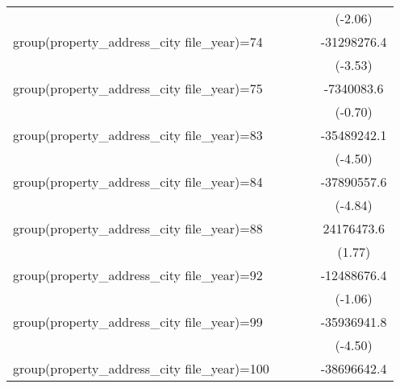 {\begin{tabular}{l*{4}{c}}
                    &                     &                     &                     &     (-2.06)         \\
\addlinespace
group(property\_address\_city file\_year)=74&                     &                     &                     & -31298276.4\sym{***}\\
                    &                     &                     &                     &     (-3.53)         \\
\addlinespace
group(property\_address\_city file\_year)=75&                     &                     &                     &  -7340083.6         \\
                    &                     &                     &                     &     (-0.70)         \\
\addlinespace
group(property\_address\_city file\_year)=83&                     &                     &                     & -35489242.1\sym{***}\\
                    &                     &                     &                     &     (-4.50)         \\
\addlinespace
group(property\_address\_city file\_year)=84&                     &                     &                     & -37890557.6\sym{***}\\
                    &                     &                     &                     &     (-4.84)         \\
\addlinespace
group(property\_address\_city file\_year)=88&                     &                     &                     &  24176473.6         \\
                    &                     &                     &                     &      (1.77)         \\
\addlinespace
group(property\_address\_city file\_year)=92&                     &                     &                     & -12488676.4         \\
                    &                     &                     &                     &     (-1.06)         \\
\addlinespace
group(property\_address\_city file\_year)=99&                     &                     &                     & -35936941.8\sym{***}\\
                    &                     &                     &                     &     (-4.50)         \\
\addlinespace
group(property\_address\_city file\_year)=100&                     &                     &                     & -38696642.4\sym{***}\\

\end{tabular}}
